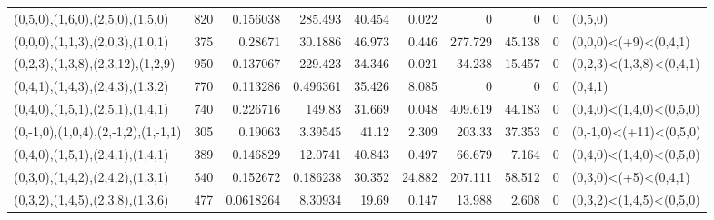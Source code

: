 \begin{tabular}{lrrrrrrrrl}
 (0,5,0),(1,6,0),(2,5,0),(1,5,0)    &    820 & 0.156038  & 285.493    &       40.454 &      0.022 &            0     &          0     &        0 & (0,5,0)                 \\
 (0,0,0),(1,1,3),(2,0,3),(1,0,1)    &    375 & 0.28671   &  30.1886   &       46.973 &      0.446 &          277.729 &         45.138 &        0 & (0,0,0)<(+9)<(0,4,1)    \\
 (0,2,3),(1,3,8),(2,3,12),(1,2,9)   &    950 & 0.137067  & 229.423    &       34.346 &      0.021 &           34.238 &         15.457 &        0 & (0,2,3)<(1,3,8)<(0,4,1) \\
 (0,4,1),(1,4,3),(2,4,3),(1,3,2)    &    770 & 0.113286  &   0.496361 &       35.426 &      8.085 &            0     &          0     &        0 & (0,4,1)                 \\
 (0,4,0),(1,5,1),(2,5,1),(1,4,1)    &    740 & 0.226716  & 149.83     &       31.669 &      0.048 &          409.619 &         44.183 &        0 & (0,4,0)<(1,4,0)<(0,5,0) \\
 (0,-1,0),(1,0,4),(2,-1,2),(1,-1,1) &    305 & 0.19063   &   3.39545  &       41.12  &      2.309 &          203.33  &         37.353 &        0 & (0,-1,0)<(+11)<(0,5,0)  \\
 (0,4,0),(1,5,1),(2,4,1),(1,4,1)    &    389 & 0.146829  &  12.0741   &       40.843 &      0.497 &           66.679 &          7.164 &        0 & (0,4,0)<(1,4,0)<(0,5,0) \\
 (0,3,0),(1,4,2),(2,4,2),(1,3,1)    &    540 & 0.152672  &   0.186238 &       30.352 &     24.882 &          207.111 &         58.512 &        0 & (0,3,0)<(+5)<(0,4,1)    \\
 (0,3,2),(1,4,5),(2,3,8),(1,3,6)    &    477 & 0.0618264 &   8.30934  &       19.69  &      0.147 &           13.988 &          2.608 &        0 & (0,3,2)<(1,4,5)<(0,5,0) \\
\hline
\end{tabular}
